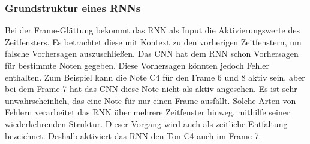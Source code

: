 \subsubsection{Grundstruktur eines RNNs}
Bei der Frame-Glättung bekommt das RNN als Input die Aktivierungswerte des Zeitfensters.
Es betrachtet diese mit Kontext zu den vorherigen Zeitfenstern, um falsche Vorhersagen auszuschließen.
Das CNN hat dem RNN schon Vorhersagen für bestimmte Noten gegeben.
Diese Vorhersagen könnten jedoch Fehler enthalten.
Zum Beispiel kann die Note C4 für den Frame 6 und 8 aktiv sein,
aber bei dem Frame 7 hat das CNN diese Note nicht als aktiv angesehen.
Es ist sehr unwahrscheinlich, das eine Note für nur einen Frame ausfällt.
Solche Arten von Fehlern verarbeitet das RNN über mehrere Zeitfenster hinweg, mithilfe seiner wiederkehrenden Struktur.
Dieser Vorgang wird auch als zeitliche Entfaltung bezeichnet.
Deshalb aktiviert das RNN den Ton C4 auch im Frame 7.

